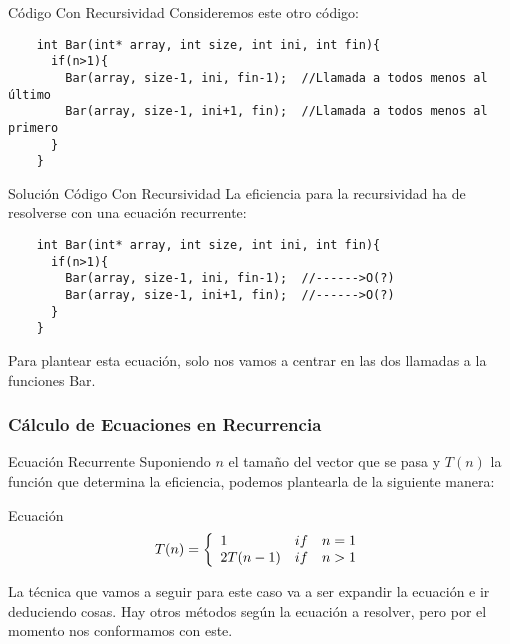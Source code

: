 \documentclass[compress]{beamer}
\begin{document}
\begin{frame}[fragile]{Código Con Recursividad}
Consideremos este otro código:\\
\vspace{0.20in}
	\begin{lstlisting}
	int Bar(int* array, int size, int ini, int fin){
	  if(n>1){
	    Bar(array, size-1, ini, fin-1);  //Llamada a todos menos al último
	    Bar(array, size-1, ini+1, fin);  //Llamada a todos menos al primero
	  }
	}
	\end{lstlisting}
\end{frame}

\begin{frame}[fragile]{Solución Código Con Recursividad}
La eficiencia para la recursividad ha de resolverse con una ecuación recurrente:\\
\vspace{0.20in}
	\begin{lstlisting}
	int Bar(int* array, int size, int ini, int fin){
	  if(n>1){
	    Bar(array, size-1, ini, fin-1);  //------>O(?)
	    Bar(array, size-1, ini+1, fin);  //------>O(?)
	  }
	}
	\end{lstlisting}
Para plantear esta ecuación, solo nos vamos a centrar en las dos llamadas a la funciones Bar.
\end{frame}

\subsubsection{Cálculo de Ecuaciones en Recurrencia}

\begin{frame}{Ecuación Recurrente}
Suponiendo $n$ el tamaño del vector que se pasa y $T(n)$ la función que determina la eficiencia, podemos plantearla de la siguiente manera:\\
\vspace{0.20in}
	\begin{block}{Ecuación}
	\[
	T(n) = \left\{
	\begin{array}{l l}
	1 & if \quad n=1\\
	2T(n-1) & if \quad n>1\\
	\end{array} \right. \]
	\end{block}
La técnica que vamos a seguir para este caso va a ser expandir la ecuación e ir deduciendo cosas. Hay otros métodos según la ecuación a resolver, pero por el momento nos conformamos con este.
\end{frame}
\end{document}
